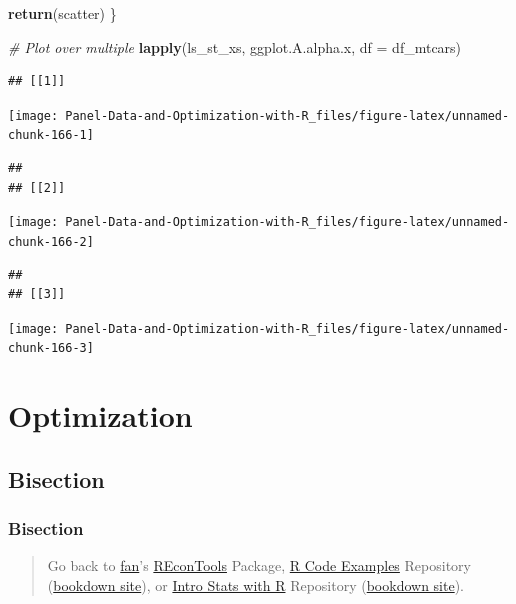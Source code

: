 \documentclass[
]{book}
\newenvironment{Shaded}{\begin{snugshade}}{\end{snugshade}}
\newcommand{\CommentTok}[1]{\textcolor[rgb]{0.56,0.35,0.01}{\textit{#1}}}
\newcommand{\DataTypeTok}[1]{\textcolor[rgb]{0.13,0.29,0.53}{#1}}
\newcommand{\KeywordTok}[1]{\textcolor[rgb]{0.13,0.29,0.53}{\textbf{#1}}}
\newcommand{\NormalTok}[1]{#1}
\begin{document}
\begin{Shaded}
\begin{Highlighting}[]
\KeywordTok{return}\NormalTok{(scatter)}
\NormalTok{\}}

\CommentTok{\# Plot over multiple}
\KeywordTok{lapply}\NormalTok{(ls\_st\_xs,}
\NormalTok{       ggplot.A.alpha.x,}
       \DataTypeTok{df =}\NormalTok{ df\_mtcars)}
\end{Highlighting}
\end{Shaded}

\begin{verbatim}
## [[1]]
\end{verbatim}

\begin{center}\texttt{[image: Panel-Data-and-Optimization-with-R\_files/figure-latex/unnamed-chunk-166-1]} \end{center}

\begin{verbatim}
## 
## [[2]]
\end{verbatim}

\begin{center}\texttt{[image: Panel-Data-and-Optimization-with-R\_files/figure-latex/unnamed-chunk-166-2]} \end{center}

\begin{verbatim}
## 
## [[3]]
\end{verbatim}

\begin{center}\texttt{[image: Panel-Data-and-Optimization-with-R\_files/figure-latex/unnamed-chunk-166-3]} \end{center}

\hypertarget{optimization}{%
\chapter{Optimization}\label{optimization}}

\hypertarget{bisection}{%
\section{Bisection}\label{bisection}}

\hypertarget{bisection-1}{%
\subsection{Bisection}\label{bisection-1}}

\begin{quote}
Go back to \href{http://fanwangecon.github.io/}{fan}'s \href{https://fanwangecon.github.io/REconTools/}{REconTools} Package, \href{https://fanwangecon.github.io/R4Econ/}{R Code Examples} Repository (\href{https://fanwangecon.github.io/R4Econ/bookdown}{bookdown site}), or \href{https://fanwangecon.github.io/Stat4Econ/}{Intro Stats with R} Repository (\href{https://fanwangecon.github.io/Stat4Econ/bookdown}{bookdown site}).
\end{quote}
\end{document}
